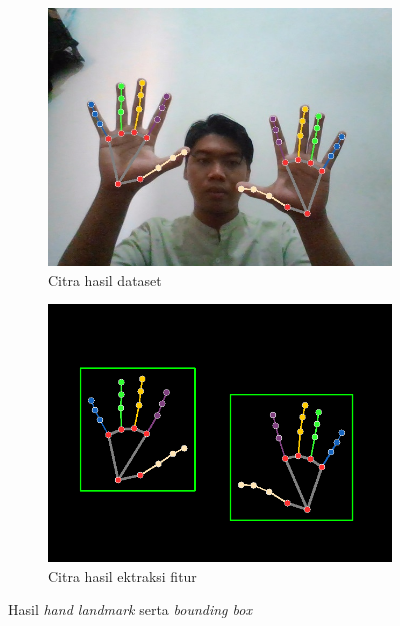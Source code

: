 \begin{figure}[H]
  \centering
  \begin{subfigure}{0.7\linewidth}
    \includegraphics[width=\linewidth]{../Gambar/Cobak17.jpg}
    \caption{Citra hasil dataset}
    \label{fig:handlandmarkcitradataset}
  \end{subfigure}
  \begin{subfigure}{0.7\linewidth}
    \includegraphics[width=\linewidth]{../Gambar/Cobak17.png}
    \caption{Citra hasil ektraksi fitur}
    \label{fig:handlandmarkcitraektraksi}
  \end{subfigure}
  \caption{Hasil \emph{hand landmark} serta \emph{bounding box}}
  \label{fig:hasilposepred}
\end{figure}

